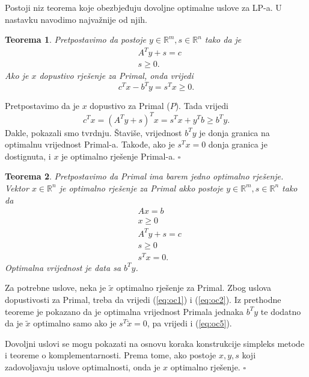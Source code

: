 \documentclass[a4paper, utf8, 11pt, colorlinks]{book}
\newtheorem{thm}{Teorema}
\newenvironment{proof}{{Dokaz:}}{\hfill$\square$}
\begin{document}
Postoji niz teorema koje obezbjeđuju dovoljne optimalne uslove za LP-a. U nastavku navodimo najvažnije od njih. 
\begin{thm}
	 Pretpostavimo da postoje $y \in \mathbb{R}^m, s \in \mathbb{R}^n$ tako da je 
	 \begin{align*}
	 	    &A^Ty + s = c \\
	 	    & s \geq 0.
	 \end{align*}
 Ako je $x$ dopustivo rješenje za Primal, onda vrijedi 
 $$ c^T x - b^T y = s^T x \geq 0 .$$
\end{thm}
\begin{proof}
	 Pretpostavimo da je $x$ dopustivo za Primal ($P$). Tada vrijedi
	 $$ c^Tx = (A^Ty + s)^Tx = s^Tx + y^Tb \geq b^T y.$$
	 Dakle, pokazali smo tvrdnju. Štaviše, vrijednost $b^Ty$ je donja granica na optimalnu vrijednost Primal-a. Takođe, ako je $s^T x = 0$ donja granica je dostignuta, i $x$ je optimalno rješenje Primal-a.
\end{proof}
\begin{thm}
	Pretpostavimo da Primal ima barem jedno optimalno rješenje. Vektor $x \in \mathbb{R}^n$ je optimalno rješenje za Primal akko postoje $y \in \mathbb{R}^m, s\in \mathbb{R}^n$ tako da 
	\begin{align}
		  &A x= b \label{eq:oc1}\\
		  & x \geq 0 \label{eq:oc2}\\
		  & A^T y + s =c \label{eq:oc3}\\
		  & s \geq 0 \label{eq:oc4}\\
		  & s^T x = 0. \label{eq:oc5} 
	\end{align}
Optimalna vrijednost je data sa $b^T y$.
\end{thm}
\begin{proof}
 Za potrebne uslove, neka je $\tilde{x}$ optimalno rješenje za Primal. Zbog uslova dopustivosti za Primal, treba da vrijedi (\ref{eq:oc1}) i (\ref{eq:oc2}). Iz prethodne teoreme je pokazano da je optimalna vrijednost Primala  jednaka $b^Ty$ te dodatno da je $\tilde{x}$ optimalno samo ako je $s^T \tilde{x}=0$, pa vrijedi i (\ref{eq:oc5}).
 
 	Dovoljni uslovi se mogu pokazati na osnovu koraka konstrukcije simpleks metode  i teoreme o komplementarnosti. Prema tome, ako postoje $x, y, s$ koji zadovoljavaju uslove optimalnosti, onda je $x$ optimalno rješenje.
\end{proof}
\end{document}
